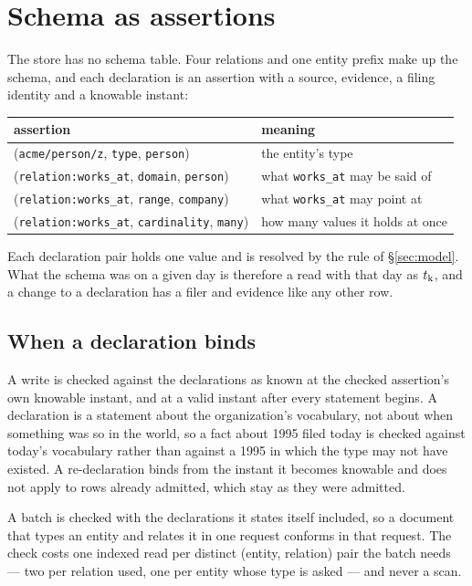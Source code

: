 \section{Schema as assertions}
\label{sec:schema}

\shipped{} The store has no schema table. Four relations and one entity prefix
make up the schema, and each declaration is an assertion with a source,
evidence, a filing identity and a knowable instant:

\begin{center}
\small
\begin{tabular}{@{}ll@{}}
\toprule
assertion & meaning \\
\midrule
(\texttt{acme/person/z}, \texttt{type}, \texttt{person}) & the entity's type \\
(\texttt{relation:works\_at}, \texttt{domain}, \texttt{person}) & what \texttt{works\_at} may be said of \\
(\texttt{relation:works\_at}, \texttt{range}, \texttt{company}) & what \texttt{works\_at} may point at \\
(\texttt{relation:works\_at}, \texttt{cardinality}, \texttt{many}) & how many values it holds at once \\
\bottomrule
\end{tabular}
\end{center}

Each declaration pair holds one value and is resolved by the rule of
\S\ref{sec:model}. What the schema was on a given day is therefore a read with
that day as $t_{\mathrm{k}}$, and a change to a declaration has a filer and evidence like
any other row.

\subsection{When a declaration binds}

A write is checked against the declarations as known at the checked assertion's
own knowable instant, and at a valid instant after every statement begins. A
declaration is a statement about the organization's vocabulary, not about when
something was so in the world, so a fact about 1995 filed today is checked
against today's vocabulary rather than against a 1995 in which the type may not
have existed. A re-declaration binds from the instant it becomes knowable and
does not apply to rows already admitted, which stay as they were admitted.

A batch is checked with the declarations it states itself included, so a
document that types an entity and relates it in one request conforms in that
request. The check costs one indexed read per distinct (entity, relation) pair
the batch needs --- two per relation used, one per entity whose type is asked
--- and never a scan.


